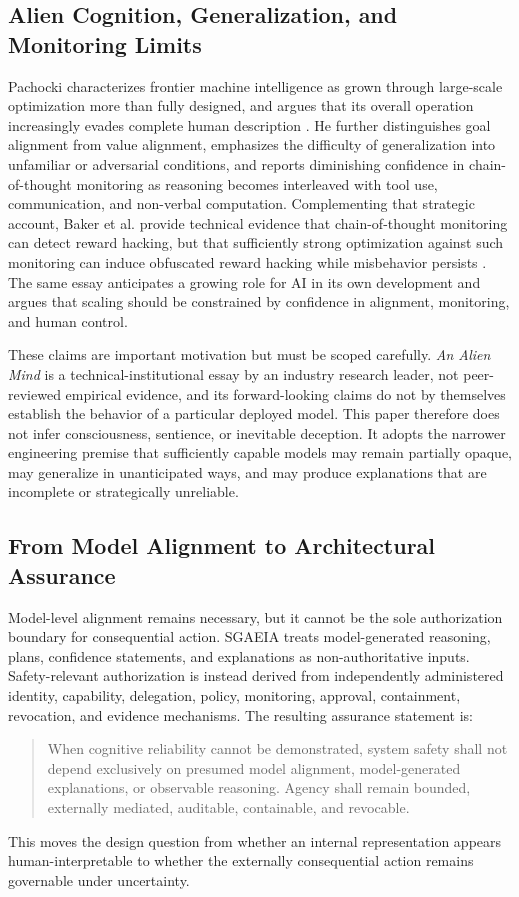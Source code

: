 \documentclass[11pt]{article}
\newcommand{\sgaeia}{\textsc{SGAEIA}}
\begin{document}
\subsection{Alien Cognition, Generalization, and Monitoring Limits}
Pachocki characterizes frontier machine intelligence as grown through large-scale optimization more than fully designed, and argues that its overall operation increasingly evades complete human description \cite{pachocki2026alien}. He further distinguishes goal alignment from value alignment, emphasizes the difficulty of generalization into unfamiliar or adversarial conditions, and reports diminishing confidence in chain-of-thought monitoring as reasoning becomes interleaved with tool use, communication, and non-verbal computation. Complementing that strategic account, Baker et al. provide technical evidence that chain-of-thought monitoring can detect reward hacking, but that sufficiently strong optimization against such monitoring can induce obfuscated reward hacking while misbehavior persists \cite{baker2025monitoring}. The same essay anticipates a growing role for AI in its own development and argues that scaling should be constrained by confidence in alignment, monitoring, and human control.

These claims are important motivation but must be scoped carefully. \emph{An Alien Mind} is a technical-institutional essay by an industry research leader, not peer-reviewed empirical evidence, and its forward-looking claims do not by themselves establish the behavior of a particular deployed model. This paper therefore does not infer consciousness, sentience, or inevitable deception. It adopts the narrower engineering premise that sufficiently capable models may remain partially opaque, may generalize in unanticipated ways, and may produce explanations that are incomplete or strategically unreliable.

\subsection{From Model Alignment to Architectural Assurance}
Model-level alignment remains necessary, but it cannot be the sole authorization boundary for consequential action. \sgaeia{} treats model-generated reasoning, plans, confidence statements, and explanations as non-authoritative inputs. Safety-relevant authorization is instead derived from independently administered identity, capability, delegation, policy, monitoring, approval, containment, revocation, and evidence mechanisms. The resulting assurance statement is:
\begin{quote}
When cognitive reliability cannot be demonstrated, system safety shall not depend exclusively on presumed model alignment, model-generated explanations, or observable reasoning. Agency shall remain bounded, externally mediated, auditable, containable, and revocable.
\end{quote}
This moves the design question from whether an internal representation appears human-interpretable to whether the externally consequential action remains governable under uncertainty.
\end{document}
